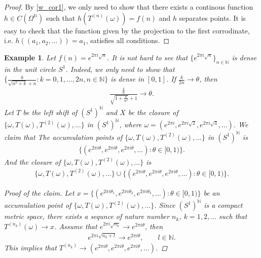 \documentclass[a4paper,10pt]{amsart}
\newtheorem{example}{Example}[section]
\newcommand{\N}{\mathbb N} %
\begin{document}
\begin{proof}
    By \cref{w_cor1}, we only need to show that there exists a continous
    function $h \in C(\Omega^{\N})$ such that 
    $h(T^{(n)}(\omega)) = f(n)$ and $h$ separates points.
    It is easy to check that the function given by the projection to the
    first corrodinate, i.e. $h((a_1,a_2,\ldots)) = a_1$, 
    satisfies all conditions.
\end{proof}

\begin{example}
Let $f(n) = e^{2\pi i \sqrt{n}}$.
It is not hard to see that
$\{ e^{2\pi i \sqrt{n}} \}_{n \in \N}$ is dense in the unit circle $S^{1}$.
Indeed, we only need to show that 
$\{\frac{k}{\sqrt{n^2 + k} + n} : k = 0, 1,
\ldots, 2n, n \in \N \}$ is dense in $[0,1]$. If $\frac{k}{2n} \to
\theta$, then
\begin{align*}
    \frac{\frac{k}{n}}{\sqrt{1 + \frac{k}{n^2}} + 1} \to \theta. 
\end{align*}
Let $T$ be the left shift of $(S^{1})^{\N}$ and $X$ be the closure of
$\{\omega, T(\omega), T^{(2)}(\omega), \ldots \}$ in $(S^{1})^{\N}$, where 
$\omega = (e^{2\pi i}, e^{2\pi i \sqrt{2}}, e^{2\pi i \sqrt{3}},
\ldots )$. 
We claim that 
The accumulation points of 
$\{\omega, T(\omega), T^{(2)}(\omega), \ldots \}$ 
in $(S^{1})^{\N}$ is
\begin{align*}
    \{(e^{2\pi i \theta}, e^{2\pi i \theta}, e^{2\pi i \theta}, \ldots ):
        \theta \in [0, 1) \}.
\end{align*}
And the closure of $\{\omega, T(\omega), T^{(2)}(\omega), \ldots \}$ is 
\begin{align*}
    \{\omega, T(\omega), T^{(2)}(\omega), \ldots \} \cup
    \{(e^{2\pi i \theta}, e^{2\pi i \theta}, e^{2\pi i \theta}, \ldots ):
        \theta \in [0, 1) \}.
\end{align*}

\begin{proof}[Proof of the claim]
   Let $x = \{(e^{2\pi i \theta_1}, e^{2\pi i \theta_2}, 
       e^{2\pi i \theta_3}, \ldots ):\theta \in [0, 1) \}$ 
       be an accumulation point of 
    $\{\omega, T(\omega), T^{(2)}(\omega), \ldots \}$. 
   Since $(S^{1})^{\N}$ is a compact metric space,  
   there exists a sequnce of nature number 
   $n_k$, $k = 1, 2, \ldots$ such that $T^{(n_k)}(\omega) \to x$.
   Assume that $e^{2\pi i \sqrt{n_{k}}} \to e^{2\pi i \theta}$,
   then
   \begin{align*}
       e^{2\pi i \sqrt{n_{k}+l}} \to e^{2\pi i \theta}, \qquad l \in \N.
   \end{align*}
   This implies that $T^{(n_k)} \to 
    (e^{2\pi i \theta}, e^{2\pi i \theta}, e^{2\pi i \theta}, \ldots )$.
\end{proof}


\end{example}
\end{document}
